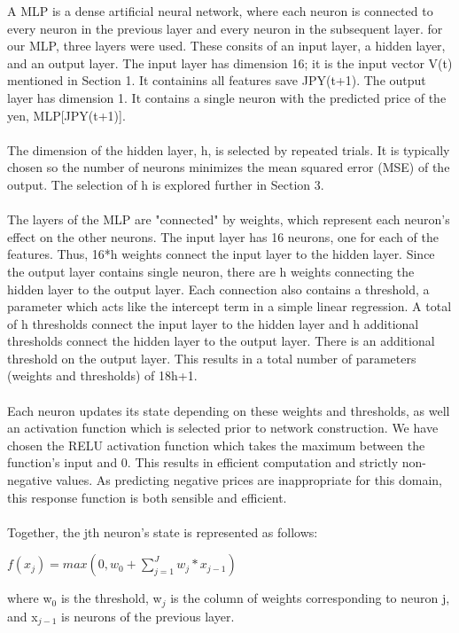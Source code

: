 \documentclass{homework}
\begin{document}
\newpage

A MLP is a dense artificial neural network, where each neuron is connected to every neuron in the previous layer and every neuron in the subsequent layer. for our MLP, three layers were used. These consits of an input layer, a hidden layer, and an output layer. The input layer has dimension 16; it is the input vector V(t) mentioned in Section 1. It containins all features save JPY(t+1). The output layer has dimension 1. It contains a single neuron with the predicted price of the yen, MLP[JPY(t+1)].\\\\
The dimension of the hidden layer, h, is selected by repeated trials. It is typically chosen so the number of neurons minimizes the mean squared error (MSE) of the output. The selection of h is  explored further in Section 3.\\\\
The layers of the MLP are "connected" by weights, which represent each neuron's effect on the other neurons. The input layer has 16 neurons, one for each of the features. Thus, 16*h weights connect the input layer to the hidden layer. Since the output layer contains single neuron, there are h weights connecting the hidden layer to the output layer. Each connection also contains a threshold, a parameter which acts like the intercept term in a simple linear regression. A total of h thresholds connect the input layer to the hidden layer and h additional thresholds connect the hidden layer to the output layer. There is an additional threshold on the output layer. This results in a total number of parameters (weights and thresholds) of 18h+1.\\\\
Each neuron updates its state depending on these weights and thresholds, as well an activation function which is selected prior to network construction. We have chosen the RELU activation function which takes the maximum between the function's input and 0. This results in efficient computation and strictly non-negative values. As predicting negative prices are inappropriate for this domain, this response function is both sensible and efficient.\\\\
Together, the jth neuron's state is represented as follows:
\begin{center} \begin{math}
f(x_j) = max(0, w_0 + \sum_{j=1}^{J} w_j*x_{j-1}) 
\end{math} \end{center}
where w$_0$ is the threshold, w$_j$ is the column of weights corresponding to neuron j, and x$_{j-1}$ is neurons of the previous layer.
\end{document}
